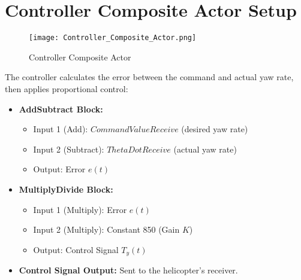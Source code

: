 \documentclass{article}
\begin{document}
\section{Controller Composite Actor Setup}
\begin{figure}
    \centering
    \texttt{[image: Controller\_Composite\_Actor.png]}
    \caption{Controller Composite Actor}
    \label{fig:controller}
\end{figure}
The controller calculates the error between the command and actual yaw rate, then applies proportional control:
\begin{itemize}
    \item \textbf{AddSubtract Block:}
    \begin{itemize}
        \item Input 1 (Add): $CommandValueReceive$ (desired yaw rate)
        \item Input 2 (Subtract): $ThetaDotReceive$ (actual yaw rate)
        \item Output: Error $e(t)$
    \end{itemize}
    \item \textbf{MultiplyDivide Block:}
    \begin{itemize}
        \item Input 1 (Multiply): Error $e(t)$
        \item Input 2 (Multiply): Constant 850 (Gain $K$)
        \item Output: Control Signal $T_y(t)$
    \end{itemize}
    \item \textbf{Control Signal Output:} Sent to the helicopter’s receiver.
\end{itemize}
\end{document}
